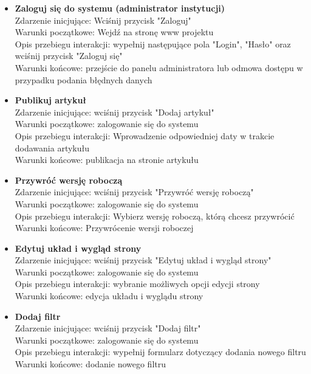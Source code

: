 \documentclass{article}
\begin{document}
\begin{itemize}
	\item \textbf{Zaloguj się do systemu (administrator instytucji)}
	\\Zdarzenie inicjujące: Wciśnij przycisk "Zaloguj"
	\\Warunki początkowe: Wejdź na stronę www projektu	
	\\Opis przebiegu interakcji: wypełnij następujące pola "Login", "Hasło" oraz wciśnij przycisk "Zaloguj się"	
	\\Warunki końcowe: przejście do panelu administratora lub odmowa dostępu w przypadku podania błędnych danych

	
	\item \textbf{Publikuj artykuł}
	\\Zdarzenie inicjujące: wciśnij przycisk "Dodaj artykuł"	
	\\Warunki początkowe: zalogowanie się do systemu
	\\Opis przebiegu interakcji: Wprowadzenie odpowiedniej daty w trakcie dodawania artykułu
	\\Warunki końcowe: publikacja na stronie artykułu
	
	
	\item \textbf{Przywróć wersję roboczą}
	\\Zdarzenie inicjujące: wciśnij przycisk "Przywróć wersję roboczą"
	\\Warunki początkowe: zalogowanie się do systemu	
	\\Opis przebiegu interakcji: Wybierz wersję roboczą, którą chcesz przywrócić
	\\Warunki końcowe: Przywrócenie wersji roboczej 
	
	
	\item \textbf{Edytuj układ i wygląd strony}
	\\Zdarzenie inicjujące: wciśnij przycisk "Edytuj układ i wygląd strony"	
	\\Warunki początkowe: zalogowanie się do systemu 	
	\\Opis przebiegu interakcji: wybranie możliwych opcji edycji strony	
	\\Warunki końcowe: edycja układu i wyglądu strony
	

	
	\item \textbf{Dodaj filtr}
	\\Zdarzenie inicjujące: wciśnij przycisk "Dodaj filtr"	
	\\Warunki początkowe: zalogowanie się do systemu	
	\\Opis przebiegu interakcji: wypełnij formularz dotyczący dodania nowego filtru	
	\\Warunki końcowe: dodanie nowego filtru


\end{itemize}
\end{document}
